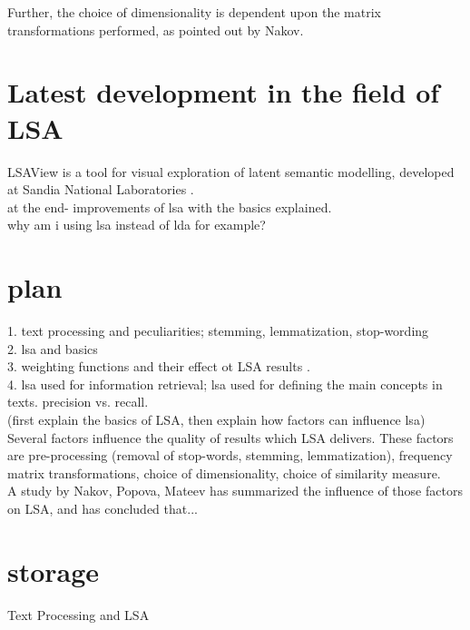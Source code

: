 Further, the choice of dimensionality is dependent upon the matrix transformations performed, as pointed out by Nakov\cite{NakovBetterResultsLSI}.\\


\section{Latest development in the field of LSA}
LSAView is a tool for visual exploration of latent semantic modelling, developed at Sandia National Laboratories \cite{CrDuSh09}.\\

at the end- improvements of lsa with the basics explained.\\
why am i using lsa instead of lda for example?\\
\section{plan}
\label{sec:lsa:plan}
1. text processing and peculiarities; stemming, lemmatization, stop-wording\\
2. lsa and basics\\
3. weighting functions and their effect ot LSA results \cite{Nakov_weightfunctions}. \\
4. lsa used for information retrieval; lsa used for defining the main concepts in texts. precision vs. recall. \\
(first explain the basics of LSA, then explain how factors can influence lsa)\\
Several factors influence the quality of results which LSA delivers. These factors are pre-processing (removal of stop-words, stemming, lemmatization), frequency matrix transformations, choice of dimensionality, choice of similarity measure.\\
A study by Nakov, Popova, Mateev\cite{Nakov_weightfunctions} has summarized the influence of those factors on LSA, and has concluded that...\\

\section{storage}
Text Processing and LSA\\

